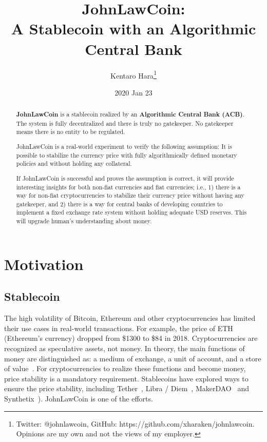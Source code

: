 \documentclass[dvipdfmx,a4paper]{article}
\title{\textbf{JohnLawCoin:\\A Stablecoin with an Algorithmic Central Bank}}
\author{Kentaro Hara\footnote{Twitter: @johnlawcoin, GitHub: https://github.com/xharaken/johnlawcoin. Opinions are my own and not the views of my employer.}}
\date{2020 Jan 23}
\begin{document}
\maketitle

\begin{abstract}

\textbf{JohnLawCoin} is a stablecoin realized by an \textbf{Algorithmic Central Bank (ACB)}. The system is fully decentralized and there is truly no gatekeeper. No gatekeeper means there is no entity to be regulated.

JohnLawCoin is a real-world experiment to verify the following assumption: It is possible to stabilize the currency price with fully algorithmically defined monetary policies and without holding any collateral.

If JohnLawCoin is successful and proves the assumption is correct, it will provide interesting insights for both non-fiat currencies and fiat currencies; i.e., 1) there is a way for non-fiat cryptocurrencies to stabilize their currency price without having any gatekeeper, and 2) there is a way for central banks of developing countries to implement a fixed exchange rate system without holding adequate USD reserves. This will upgrade human's understanding about money.

\end{abstract}

\section{Motivation}

\subsection{Stablecoin}

The high volatility of Bitcoin, Ethereum and other cryptocurrencies has limited their use cases in real-world transactions. For example, the price of ETH (Ethereum's currency) dropped from \$1300 to \$84 in 2018. Cryptocurrencies are recognized as speculative assets, not money. In theory, the main functions of money are distinguished as: a medium of exchange, a unit of account, and a store of value~\cite{davies2010history,ferguson2008ascent}. For cryptocurrencies to realize these functions and become money, price stability is a mandatory requirement. Stablecoins have explored ways to ensure the price stability, including Tether~\cite{tether}, Libra / Diem~\cite{libra}, MakerDAO~\cite{makerdao} and Synthetix~\cite{synthetix}). JohnLawCoin is one of the efforts.
\end{document}
